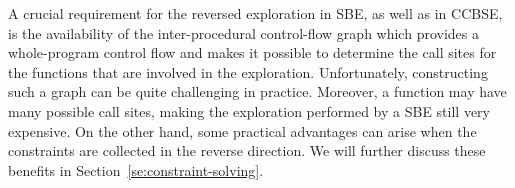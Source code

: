 {%

A crucial requirement for the reversed exploration in SBE, as well as in CCBSE, is the availability of the inter-procedural control-flow graph which provides a whole-program control flow and makes it possible to determine the call sites for the functions that are involved in the exploration. Unfortunately, constructing such a graph can be quite challenging in practice. Moreover, a function may have many possible call sites, making the exploration performed by a SBE still very expensive. On the other hand, some practical advantages can arise when the constraints are collected in the reverse direction. We will further discuss these benefits in Section~\ref{se:constraint-solving}.
}

